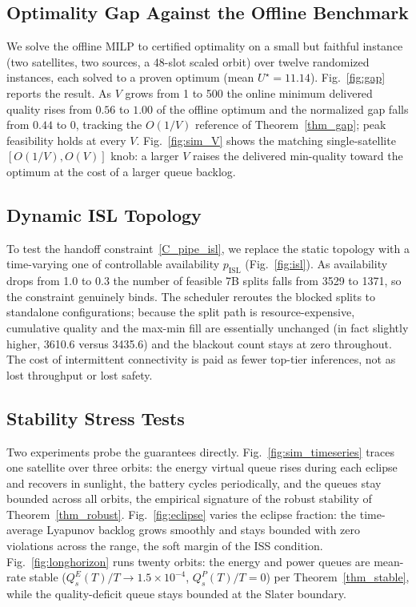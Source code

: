 \subsection{Optimality Gap Against the Offline Benchmark}\label{EV_GAP}
We solve the offline MILP to certified optimality on a small but faithful instance (two satellites,
two sources, a 48-slot scaled orbit) over twelve randomized instances, each solved to a proven
optimum (mean $U^\star{=}11.14$). Fig.~\ref{fig:gap} reports the result. As $V$ grows from 1 to 500
the online minimum delivered quality rises from $0.56$ to $1.00$ of the offline optimum and the
normalized gap falls from $0.44$ to $0$, tracking the $O(1/V)$ reference of Theorem~\ref{thm_gap};
peak feasibility holds at every $V$. Fig.~\ref{fig:sim_V} shows the matching single-satellite
$[O(1/V),O(V)]$ knob: a larger $V$ raises the delivered min-quality toward the optimum at the cost of
a larger queue backlog.

\subsection{Dynamic ISL Topology}\label{EV_ISL}
To test the handoff constraint~\eqref{C_pipe_isl}, we replace the static topology with a
time-varying one of controllable availability $p_{\text{ISL}}$ (Fig.~\ref{fig:isl}). As availability
drops from 1.0 to 0.3 the number of feasible 7B splits falls from 3529 to 1371, so the constraint
genuinely binds. The scheduler reroutes the blocked splits to standalone configurations; because the
split path is resource-expensive, cumulative quality and the max-min fill are essentially unchanged
(in fact slightly higher, 3610.6 versus 3435.6) and the blackout count stays at zero throughout. The
cost of intermittent connectivity is paid as fewer top-tier inferences, not as lost throughput or
lost safety.

\subsection{Stability Stress Tests}\label{EV_STAB}
Two experiments probe the guarantees directly. Fig.~\ref{fig:sim_timeseries} traces one satellite
over three orbits: the energy virtual queue rises during each eclipse and recovers in sunlight, the
battery cycles periodically, and the queues stay bounded across all orbits, the empirical signature
of the robust stability of Theorem~\ref{thm_robust}. Fig.~\ref{fig:eclipse} varies the eclipse fraction: the time-average
Lyapunov backlog grows smoothly and stays bounded with zero violations across the range, the soft
margin of the ISS condition. Fig.~\ref{fig:longhorizon} runs twenty orbits: the energy and power
queues are mean-rate stable ($Q_s^E(T)/T\to1.5\times10^{-4}$, $Q_s^P(T)/T=0$) per
Theorem~\ref{thm_stable}, while the quality-deficit queue stays bounded at the Slater boundary.
